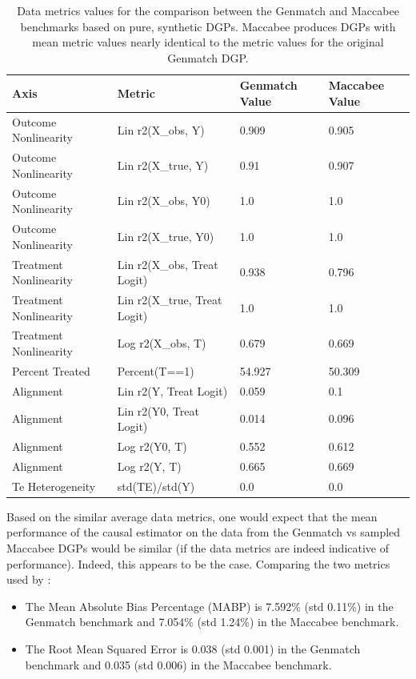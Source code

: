 \documentclass[../main.tex]{subfiles}
\begin{document}
\begin{table}[ht!]
\centering
    \begin{tabular}{|l|l|m{2cm}|m{2cm}|}
    \hline
    \rowcolor[HTML]{EFEFEF} 
    Axis & Metric & Genmatch Value & Maccabee Value \\ \hline
    Outcome Nonlinearity & Lin r2(X\_obs, Y) & 0.909 & 0.905 \\ \hline
    Outcome Nonlinearity & Lin r2(X\_true, Y) & 0.91 & 0.907 \\ \hline
    Outcome Nonlinearity & Lin r2(X\_obs, Y0) & 1.0 & 1.0 \\ \hline
    Outcome Nonlinearity & Lin r2(X\_true, Y0) & 1.0 & 1.0 \\ \hline
    Treatment Nonlinearity & Lin r2(X\_obs, Treat Logit) & 0.938 & 0.796 \\ \hline
    Treatment Nonlinearity & Lin r2(X\_true, Treat Logit) & 1.0 & 1.0 \\ \hline
    Treatment Nonlinearity & Log r2(X\_obs, T) & 0.679 & 0.669 \\ \hline
    Percent Treated & Percent(T==1) & 54.927 & 50.309 \\ \hline
    Alignment & Lin r2(Y, Treat Logit) & 0.059 & 0.1 \\ \hline
    Alignment & Lin r2(Y0, Treat Logit) & 0.014 & 0.096 \\ \hline
    Alignment & Log r2(Y0, T) & 0.552 & 0.612 \\ \hline
    Alignment & Log r2(Y, T) & 0.665 & 0.669 \\ \hline
    Te Heterogeneity & std(TE)/std(Y) & 0.0 & 0.0 \\ \hline
    \end{tabular}
    \caption{Data metrics values for the comparison between the Genmatch and Maccabee benchmarks based on pure, synthetic DGPs. Maccabee produces DGPs with mean metric values nearly identical to the metric values for the original Genmatch DGP.}
    \label{tbl:pure-synth-data-metrics-1}
\end{table}
\FloatBarrier

Based on the similar average data metrics, one would expect that the mean performance of the causal estimator on the data from the Genmatch vs sampled Maccabee DGPs would be similar (if the data metrics are indeed indicative of performance). Indeed, this appears to be the case. Comparing the two metrics used by \citeauthor{Diamond2012GeneticStudies}:

\begin{itemize}
    \item The Mean Absolute Bias Percentage (MABP) is 7.592\% (std 0.11\%) in the Genmatch benchmark and 7.054\% (std 1.24\%) in the Maccabee benchmark.
    
    \item The Root Mean Squared Error is 0.038 (std 0.001) in the Genmatch benchmark and 0.035 (std 0.006) in the Maccabee benchmark.
\end{itemize}
\end{document}
